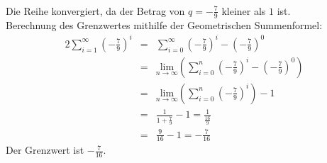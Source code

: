 \documentclass[10pt,a4paper,oneside,ngerman,numbers=noenddot]{scrartcl}
\begin{document}
\subsubsection{} %
Die Reihe konvergiert, da der Betrag von $q = -\frac{7}{9}$ kleiner als $1$ ist.\\
Berechnung des Grenzwertes mithilfe der Geometrischen Summenformel:\\
\begin{alignat*}{2}
\sum\limits_{i=1}^{\infty} \left(-\frac{7}{9}\right)^{i} &=& \sum\limits_{i=0}^{\infty} \left(-\frac{7}{9}\right)^{i} - \left(-\frac{7}{9}\right)^{0} \\
&=& \underset{n \rightarrow \infty}{\text{lim}} \left( \sum\limits_{i=0}^{n} \left(-\frac{7}{9}\right)^{i} - \left(-\frac{7}{9}\right)^{0} \right) \\
&=& \underset{n \rightarrow \infty}{\text{lim}} \left( \sum\limits_{i=0}^{n} \left(-\frac{7}{9}\right)^{i} \right) - 1 \\
&=& \frac{1}{1 + \frac{7}{9}} - 1 = \frac{1}{\frac{16}{9}} \\
&=& \frac{9}{16} - 1 = -\frac{7}{16}
\end{alignat*}
Der Grenzwert ist $-\frac{7}{16}$.
\end{document}
